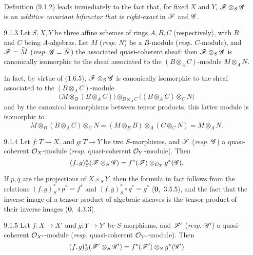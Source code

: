 \documentclass[../main.tex]{subfiles}
\begin{document}
Definition (9.1.2) leads immediately to the fact that, for fixed $X$ and $Y$, $\mathscr{F}\otimes_S\mathscr{G}$ is an \emph{additive covariant bifunctor that is right-exact} in $\mathscr{F}$ and $\mathscr{G}$.

\begin{cx}[Proposition]{9.1.3}
    Let $S,X,Y$ be three affine schemes of rings $A,B,C$ (respectively), with $B$ and $C$ being $A$-algebras.
    Let $M$ (\emph{resp.} $N$) be a $B$-module (\emph{resp.} $C$-module), and $\mathscr{F}=\widetilde{M}$ (\emph{resp.} $\mathscr{G}=\widetilde{N}$) the associated quasi-coherent sheaf; then $\mathscr{F}\otimes_S\mathscr{G}$ is canonically isomorphic to the sheaf associated to the $(B\otimes_A C)$-module $M\otimes_A N$.
\end{cx}

In fact, by virtue of (1.6.5), $\mathscr{F}\otimes_S\mathscr{G}$ is canonically isomorphic to the sheaf associated to the $(B\otimes_A C)$-module
\begin{equation*}
    \big( M\otimes_B(B\otimes_A C) \big) \otimes_{B\otimes_A C} \big( (B\otimes_A C)\otimes_C N \big)
\end{equation*}
and by the canonical isomorphisms between tensor products, this latter module is isomorphic to
\begin{equation*}
    M\otimes_B(B\otimes_A C)\otimes_C N = (M\otimes_B B)\otimes_A(C\otimes_C N) = M\otimes_A N.
\end{equation*}

\begin{cx}[Proposition]{9.1.4}
    Let $f\colon T\to X$, and $g\colon T\to Y$ be two $S$-morphisms, and $\mathscr{F}$ (\emph{resp.} $\mathscr{G}$) a quasi-coherent $\mathcal{O}_X$-module (\emph{resp.} quasi-coherent $\mathcal{O}_Y$-module).
    Then
    \begin{equation*}
        (f,g)^*_S(\mathscr{F}\otimes_S\mathscr{G}) = f^*(\mathscr{F})\otimes_{\mathcal{O}_T}g^*(\mathscr{G}).
    \end{equation*}
\end{cx}

If $p,q$ are the projections of $X\times_S Y$, then the formula in fact follows from the relations $(f,g)^*_S\circ p^*=f^*$ and $(f,g)^*_S\circ q^*=g^*$ (\textbf{0},~3.5.5), and the fact that the inverse image of a tensor product of algebraic sheaves is the tensor product of their inverse images (\textbf{0},~4.3.3).

\begin{cx}[Corollary]{9.1.5}
    Let $f\colon X\to X'$ and $g\colon Y\to Y'$ be $S$-morphisms, and $\mathscr{F}'$ (\emph{resp.} $\mathscr{G}'$) a quasi-coherent $\mathcal{O}_{X'}$-module (\emph{resp.} quasi-coherent $\mathcal{O}_{Y'}$-module).
    Then
    \begin{equation*}
        (f,g)^*_S(\mathscr{F}'\otimes_S\mathscr{G}') = f^*(\mathscr{F}')\otimes_S g^*(\mathscr{G}')
    \end{equation*}
\end{cx}
\end{document}
